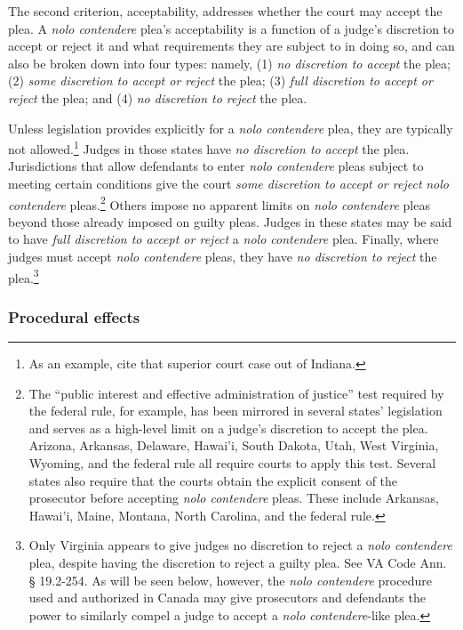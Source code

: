 The second criterion, acceptability, addresses whether the court may accept the plea. A \textit{nolo contendere} plea's acceptability is a function of a judge’s discretion to accept or reject it and what requirements they are subject to in doing so, and can also be broken down into four types: namely, (1) \textit{no discretion to accept} the plea; (2) \textit{some discretion to accept or reject} the plea; (3) \textit{full discretion to accept or reject} the plea; and (4) \textit{no discretion to reject} the plea.

Unless legislation provides explicitly for a \textit{nolo contendere} plea, they are typically not allowed.\footnote{As an example, cite that superior court case out of Indiana.} Judges in those states have \textit{no discretion to accept} the plea. Jurisdictions that allow defendants to enter \textit{nolo contendere} pleas subject to meeting certain conditions give the court \textit{some discretion to accept or reject} \textit{nolo contendere} pleas.\footnote{The ``public interest and effective administration of justice” test required by the federal rule, for example, has been mirrored in several states' legislation and serves as a high-level limit on a judge's discretion to accept the plea. Arizona, Arkansas, Delaware, Hawai'i, South Dakota, Utah, West Virginia, Wyoming, and the federal rule all require courts to apply this test. Several states also require that the courts obtain the explicit consent of the prosecutor before accepting \textit{nolo contendere} pleas. These include Arkansas, Hawai'i, Maine, Montana, North Carolina, and the federal rule.} Others impose no apparent limits on \textit{nolo contendere} pleas beyond those already imposed on guilty pleas. Judges in these states may be said to have \textit{full discretion to accept or reject} a \textit{nolo contendere} plea. Finally, where judges must accept \textit{nolo contendere} pleas, they have \textit{no discretion to reject} the plea.\footnote{Only Virginia appears to give judges no discretion to reject a \textit{nolo contendere} plea, despite having the discretion to reject a guilty plea. See VA Code Ann. § 19.2-254. As will be seen below, however, the \textit{nolo contendere} procedure used and authorized in Canada may give prosecutors and defendants the power to similarly compel a judge to accept a \textit{nolo contendere}-like plea.}

\subsubsection{Procedural effects}

